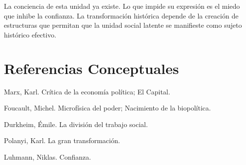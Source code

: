 \documentclass[12pt,a4paper]{article}
\begin{document}
La conciencia de esta unidad ya existe. Lo que impide su expresión es el miedo que inhibe la confianza. La transformación histórica depende de la creación de estructuras que permitan que la unidad social latente se manifieste como sujeto histórico efectivo.

\section*{Referencias Conceptuales}

Marx, Karl. Crítica de la economía política; El Capital.

Foucault, Michel. Microfísica del poder; Nacimiento de la biopolítica.

Durkheim, Émile. La división del trabajo social.

Polanyi, Karl. La gran transformación.

Luhmann, Niklas. Confianza.
\end{document}
